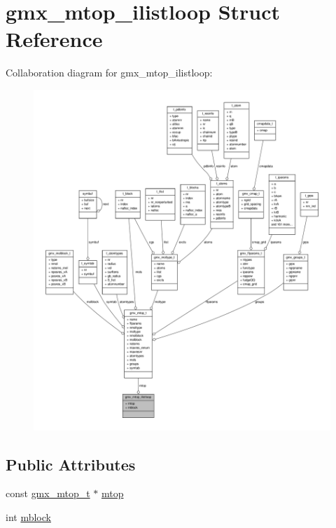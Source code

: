\hypertarget{structgmx__mtop__ilistloop}{\section{gmx\-\_\-mtop\-\_\-ilistloop \-Struct \-Reference}
\label{structgmx__mtop__ilistloop}
}


\-Collaboration diagram for gmx\-\_\-mtop\-\_\-ilistloop\-:
\nopagebreak
\begin{figure}[H]
\begin{center}
\leavevmode
\includegraphics[width=350pt]{structgmx__mtop__ilistloop__coll__graph}
\end{center}
\end{figure}
\subsection*{\-Public \-Attributes}
\begin{DoxyCompactItemize}
\item 
const \hyperlink{structgmx__mtop__t}{gmx\-\_\-mtop\-\_\-t} $\ast$ \hyperlink{structgmx__mtop__ilistloop_a09750a3a7e337291054a3e5909d1b27e}{mtop}
\item 
int \hyperlink{structgmx__mtop__ilistloop_a1df120c79bb4107075b5d26e6f4a9fd8}{mblock}
\end{DoxyCompactItemize}


